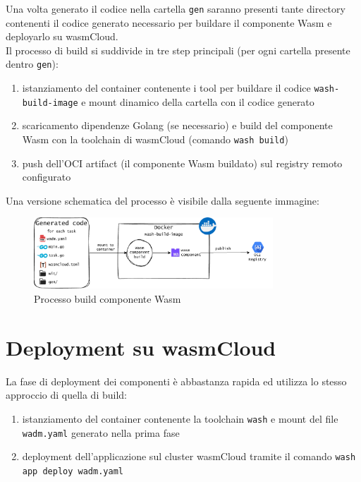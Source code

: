 Una volta generato il codice nella cartella \texttt{gen} saranno presenti tante directory contenenti il codice generato necessario per buildare il componente Wasm e deployarlo su wasmCloud.\\
Il processo di build si suddivide in tre step principali (per ogni cartella presente dentro \texttt{gen}):
\begin{enumerate}
    \item istanziamento del container contenente i tool per buildare il codice \texttt{wash-build-image} e mount dinamico della cartella con il codice generato
    \item scaricamento dipendenze Golang (se necessario) e build del componente Wasm con la toolchain di wasmCloud (comando \texttt{wash build})
    \item push dell'OCI artifact (il componente Wasm buildato) sul registry remoto configurato
\end{enumerate}
Una versione schematica del processo è visibile dalla seguente immagine:

\FloatBarrier
\begin{figure}[h]
    \centering
    \includegraphics[width=0.8\textwidth]{img/schemi/schemi-architettura-build.drawio.pdf}
    \caption{Processo build componente Wasm}
    \label{fig:code_build_pipeline}
\end{figure}
\FloatBarrier

\section{Deployment su wasmCloud}

La fase di deployment dei componenti è abbastanza rapida ed utilizza lo stesso approccio di quella di build:
\begin{enumerate}
    \item istanziamento del container contenente la toolchain \texttt{wash} e mount del file \texttt{wadm.yaml} generato nella prima fase
    \item deployment dell'applicazione sul cluster wasmCloud tramite il comando \texttt{wash app deploy wadm.yaml}
\end{enumerate}

